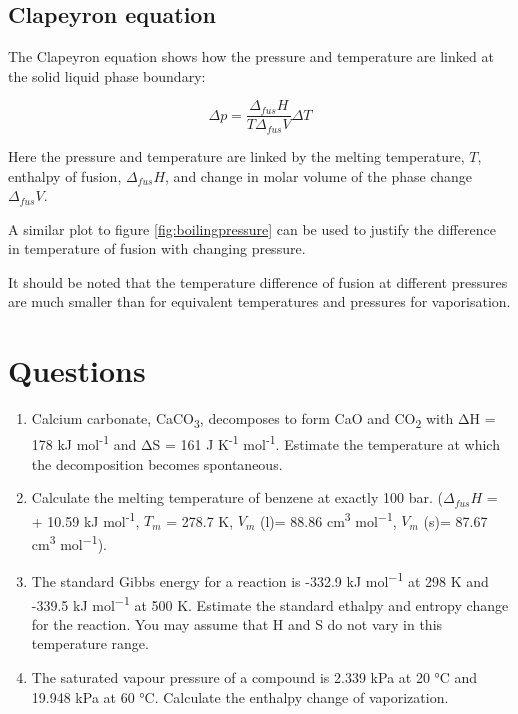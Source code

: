 \documentclass[
]{book}
\begin{document}
\hypertarget{clapeyron-equation}{%
\subsection{Clapeyron equation}\label{clapeyron-equation}}

The Clapeyron equation shows how the pressure and temperature are linked at the solid liquid phase boundary:

\begin{equation}
\Delta p=\frac{\Delta_{fus} H}{T \Delta _{fus}V}\Delta T
\label{eq:clapeyron}
\end{equation}

Here the pressure and temperature are linked by the melting temperature, \(T\), enthalpy of fusion, \(\Delta _{fus}H\), and change in molar volume of the phase change \(\Delta _{fus} V\).

A similar plot to figure \ref{fig:boilingpressure} can be used to justify the difference in temperature of fusion with changing pressure.

It should be noted that the temperature difference of fusion at different pressures are much smaller than for equivalent temperatures and pressures for vaporisation.

\hypertarget{sec:w4p1question}{%
\section{Questions}\label{sec:w4p1question}}

\begin{enumerate}
\def\labelenumi{\arabic{enumi}.}
\item
  Calcium carbonate, CaCO\textsubscript{3}, decomposes to form CaO and CO\textsubscript{2} with ΔH = 178 kJ mol\textsuperscript{-1} and ΔS = 161 J K\textsuperscript{-1} mol\textsuperscript{-1}. Estimate the temperature at which the decomposition becomes spontaneous.
\item
  Calculate the melting temperature of benzene at exactly 100 bar. (\(\Delta _{fus} H\) = + 10.59 kJ mol\textsuperscript{-1}, \(T_m\) = 278.7 K, \(V_m\) (l)= 88.86 cm\textsuperscript{3} mol\textsuperscript{−1}, \(V_m\) (s)= 87.67 cm\textsuperscript{3} mol\textsuperscript{−1}).
\item
  The standard Gibbs energy for a reaction is -332.9 kJ mol\textsuperscript{−1} at 298 K and -339.5 kJ mol\textsuperscript{−1} at 500 K. Estimate the standard ethalpy and entropy change for the reaction. You may assume that H and S do not vary in this temperature range.
\item
  The saturated vapour pressure of a compound is 2.339 kPa at 20 °C and 19.948 kPa at 60 °C. Calculate the enthalpy change of vaporization.
\end{enumerate}
\end{document}
